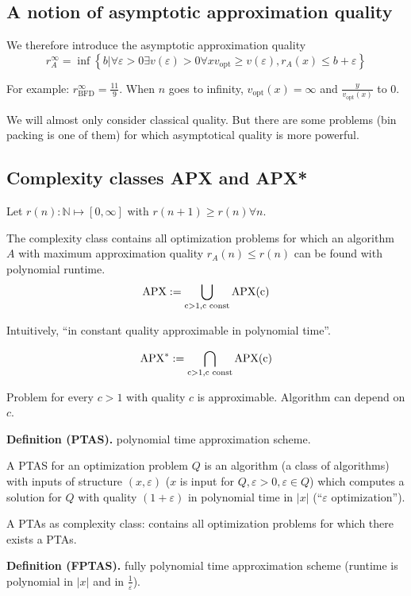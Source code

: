 \documentclass[a4paper]{article}
\newcommand{\cls}[1]{\rm{#1}}
\newcommand{\probl}[1]{\text{\textsc{#1}}}
\begin{document}
\subsection{A notion of asymptotic approximation quality}
%
We therefore introduce the asymptotic approximation quality
\[
  r_A^\infty = \operatorname{inf}\left\{
    b | \forall \varepsilon > 0 \exists v(\varepsilon) > 0
    \forall x v_{\text{opt}} \geq v(\varepsilon),
    r_A(x) \leq b + \varepsilon
  \right\}
\]

For example: $r_{\text{BFD}}^\infty = \frac{11}{9}$.
When $n$ goes to infinity, $v_{\text{opt}}(x) = \infty$
and $\frac{y}{v_{\text{opt}}(x)}$ to $0$.

We will almost only consider classical quality.
But there are some problems (bin packing is one of them)
for which asymptotical quality is more powerful.

\subsection{Complexity classes \cls{APX} and \cls{APX*}}
%
Let $r(n): \mathbb{N} \mapsto [0, \infty]$ with $r(n + 1) \geq r(n) \forall n$.

The complexity class \probl{APX($r(n)$)} contains all optimization problems for which an algorithm $A$ with maximum approximation quality $r_A(n) \leq r(n)$ can be found with polynomial runtime.
\[ \cls{APX} := \bigcup_{c>1, c \text{ const}} \cls{APX}(c) \]

Intuitively, ``in constant quality approximable in polynomial time''.

\[
  \cls{APX}^* := \bigcap_{c>1, c \text{ const}} \cls{APX}(c)
\]

Problem for every $c > 1$ with quality $c$ is approximable. Algorithm can depend on $c$.

\textbf{Definition (PTAS).} polynomial time approximation scheme.

A PTAS for an optimization problem $Q$ is an algorithm
(a class of algorithms) with inputs of structure $(x, \varepsilon)$
($x$ is input for $Q, \varepsilon > 0, \varepsilon \in Q$)
which computes a solution for $Q$ with quality $(1 + \varepsilon)$
in polynomial time in $|x|$ (``$\varepsilon$ optimization'').

A PTAs as complexity class:
  contains all optimization problems for which there exists a PTAs.

\textbf{Definition (\cls{FPTAS}).}
  fully polynomial time approximation scheme
  (runtime is polynomial in $|x|$ and in $\frac1{\varepsilon}$).
\end{document}
